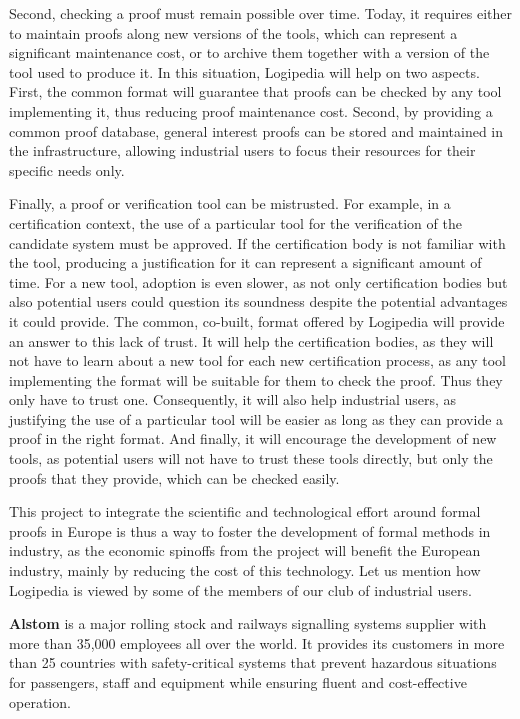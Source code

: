 Second, checking a proof must remain possible over time. Today, it
requires either to maintain proofs along new versions of the tools,
which can represent a significant maintenance cost, or to archive
them together with a version of the tool used to produce it. In this
situation, Logipedia will help on two aspects. First, the
common format will guarantee that proofs can be checked by any tool
implementing it, thus reducing proof maintenance cost. Second, by
providing a common proof database, general interest proofs can be
stored and maintained in the infrastructure, allowing industrial users
to focus their resources for their specific needs only.

Finally, a proof or verification tool can be mistrusted. For example,
in a certification context, the use of a particular tool for the
verification of the candidate system must be approved. If the
certification body is not familiar with the tool, producing a
justification for it can represent a significant amount of time. For a
new tool, adoption is even slower, as not only certification bodies
but also potential users could question its soundness despite the
potential advantages it could provide. The common, co-built, format
offered by Logipedia will provide an answer to this lack of trust. It
will help the certification bodies, as they will not have to learn
about a new tool for each new certification process, as any tool
implementing the format will be suitable for them to check the
proof. Thus they only have to trust one. Consequently, it will also
help industrial users, as justifying the use of a particular tool will
be easier as long as they can provide a proof in the right format. And
finally, it will encourage the development of new tools, as potential
users will not have to trust these tools directly, but only the proofs
that they provide, which can be checked easily.

This project to integrate the scientific and technological effort
around formal proofs in Europe is thus a way to foster the
development of formal methods in industry, as the economic spinoffs
from the project will benefit the European industry, mainly by reducing
the cost of this technology. Let us mention how Logipedia is viewed by 
some of the members of our club of industrial users. 

{\bf Alstom} is a major rolling stock and railways signalling systems
supplier with more than 35,000 employees all over the world. It
provides its customers in more than 25 countries with safety-critical
systems that prevent hazardous situations for passengers, staff and
equipment while ensuring fluent and cost-effective operation.

